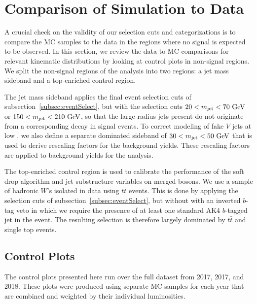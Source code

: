 
\section{Comparison of Simulation to Data}
\label{sec:comp}

A crucial check on the validity of our selection cuts and categorizations is to compare the MC samples to the data in the regions where no signal is expected to be observed.
In this section, we review the data to MC comparisons for relevant kinematic distributions by looking at control plots in non-signal regions.
We split the non-signal regions of the analysis into two regions: a jet mass sideband and a top-enriched control region.

The jet mass sideband applies the final event selection cuts of subsection~\ref{subsec:eventSelect}, but with the \MJ selection cuts $20<\MJ<70\unit{GeV}$ or $150<\MJ<210\unit{GeV}$, so that the \Vhad large-radius jets present do not originate from a corresponding \VorH decay in signal events.
To correct modeling of fake $V$ jets at low \pt, we also define a separate \Wjets dominated sideband of $30<\MJ<50\unit{GeV}$ that is used to derive rescaling factors for the \Wjets background yields.
These rescaling factors are applied to \Wjets background yields for the analysis.

The top-enriched control region is used to calibrate the performance of the soft drop algorithm and jet substructure variables on merged bosons.
We use a sample of hadronic $W$'s isolated in data using $t\bar{t}$ events.
This is done by applying the selection cuts of subsection~\ref{subsec:eventSelect}, but without with an inverted $b$-tag veto in which we require the presence of at least one standard AK4 $b$-tagged jet in the event.
The resulting selection is therefore largely dominated by $t\bar{t}$ and single top events.

\subsection{Control Plots}

The control plots presented here run over the full dataset from 2017, 2017, and 2018.
These plots were produced using separate MC samples for each year that are combined and weighted by their individual luminosities.

